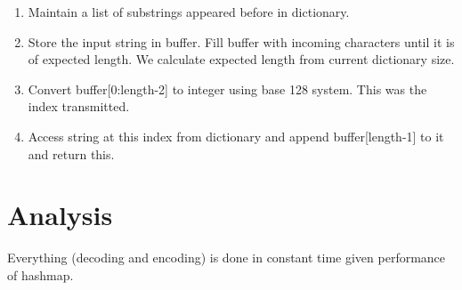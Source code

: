 \documentclass[a4paper]{article}
\begin{document}
    \begin{enumerate}
    \item Maintain a list of substrings appeared before in dictionary.
    \item Store the input string in buffer. Fill buffer with incoming characters until it is of expected length. We calculate expected length from current dictionary size.
    \item Convert buffer[0:length-2] to integer using base 128 system. This was the index transmitted.
    \item Access string at this index from dictionary and append buffer[length-1] to it and return this.
    \end{enumerate}

\section{Analysis}
Everything (decoding and encoding) is done in constant time given performance of hashmap.
\end{document}
